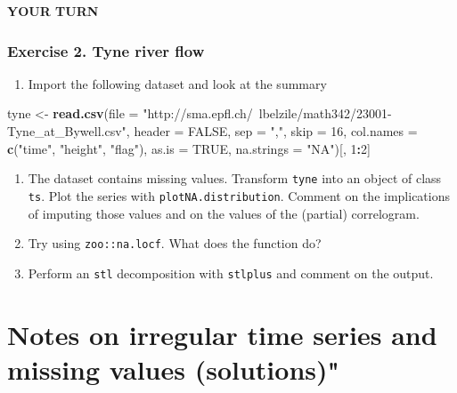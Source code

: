\documentclass[]{book}
\newenvironment{Shaded}{\begin{snugshade}}{\end{snugshade}}
\newcommand{\KeywordTok}[1]{\textcolor[rgb]{0.13,0.29,0.53}{\textbf{#1}}}
\newcommand{\DataTypeTok}[1]{\textcolor[rgb]{0.13,0.29,0.53}{#1}}
\newcommand{\DecValTok}[1]{\textcolor[rgb]{0.00,0.00,0.81}{#1}}
\newcommand{\StringTok}[1]{\textcolor[rgb]{0.31,0.60,0.02}{#1}}
\newcommand{\OtherTok}[1]{\textcolor[rgb]{0.56,0.35,0.01}{#1}}
\newcommand{\OperatorTok}[1]{\textcolor[rgb]{0.81,0.36,0.00}{\textbf{#1}}}
\newcommand{\NormalTok}[1]{#1}
\providecommand{\tightlist}{%
  \setlength{\itemsep}{0pt}\setlength{\parskip}{0pt}}
\begin{document}
\textbf{YOUR TURN}

\subsection{Exercise 2. Tyne river
flow}\label{exercise-2.-tyne-river-flow}

\begin{enumerate}
\def\labelenumi{\arabic{enumi}.}
\tightlist
\item
  Import the following dataset and look at the summary
\end{enumerate}

\begin{Shaded}
\begin{Highlighting}[]
\NormalTok{tyne <-}\StringTok{ }\KeywordTok{read.csv}\NormalTok{(}\DataTypeTok{file =} \StringTok{"http://sma.epfl.ch/~lbelzile/math342/23001-Tyne_at_Bywell.csv"}\NormalTok{, }
    \DataTypeTok{header =} \OtherTok{FALSE}\NormalTok{, }\DataTypeTok{sep =} \StringTok{","}\NormalTok{, }\DataTypeTok{skip =} \DecValTok{16}\NormalTok{, }\DataTypeTok{col.names =} \KeywordTok{c}\NormalTok{(}\StringTok{"time"}\NormalTok{, }\StringTok{"height"}\NormalTok{, }\StringTok{"flag"}\NormalTok{), }
    \DataTypeTok{as.is =} \OtherTok{TRUE}\NormalTok{, }\DataTypeTok{na.strings =} \StringTok{"NA"}\NormalTok{)[, }\DecValTok{1}\OperatorTok{:}\DecValTok{2}\NormalTok{]}
\end{Highlighting}
\end{Shaded}

\begin{enumerate}
\def\labelenumi{\arabic{enumi}.}
\setcounter{enumi}{1}
\tightlist
\item
  The dataset contains missing values. Transform \texttt{tyne} into an
  object of class \texttt{ts}. Plot the series with
  \texttt{plotNA.distribution}. Comment on the implications of imputing
  those values and on the values of the (partial) correlogram.
\item
  Try using \texttt{zoo::na.locf}. What does the function do?
\item
  Perform an \texttt{stl} decomposition with \texttt{stlplus} and
  comment on the output.
\end{enumerate}

\chapter{Notes on irregular time series and missing values
(solutions)"}\label{notes-on-irregular-time-series-and-missing-values-solutions}
\end{document}
